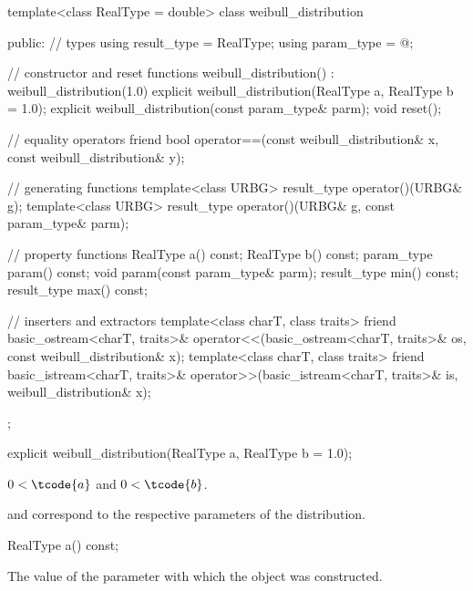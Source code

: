 %
%
\begin{codeblock}
template<class RealType = double>
  class weibull_distribution {
  public:
    // types
    using result_type = RealType;
    using param_type  = @\unspec@;

    // constructor and reset functions
    weibull_distribution() : weibull_distribution(1.0) {}
    explicit weibull_distribution(RealType a, RealType b = 1.0);
    explicit weibull_distribution(const param_type& parm);
    void reset();

    // equality operators
    friend bool operator==(const weibull_distribution& x, const weibull_distribution& y);

    // generating functions
    template<class URBG>
      result_type operator()(URBG& g);
    template<class URBG>
      result_type operator()(URBG& g, const param_type& parm);

    // property functions
    RealType a() const;
    RealType b() const;
    param_type param() const;
    void param(const param_type& parm);
    result_type min() const;
    result_type max() const;

    // inserters and extractors
    template<class charT, class traits>
      friend basic_ostream<charT, traits>&
        operator<<(basic_ostream<charT, traits>& os, const weibull_distribution& x);
    template<class charT, class traits>
      friend basic_istream<charT, traits>&
        operator>>(basic_istream<charT, traits>& is, weibull_distribution& x);
  };
\end{codeblock}

%
\begin{itemdecl}
explicit weibull_distribution(RealType a, RealType b = 1.0);
\end{itemdecl}

\begin{itemdescr}
\pnum
\expects
$0 < \tcode{a}$ and $0 < \tcode{b}$.

\pnum
\remarks
{} and 
correspond to the respective parameters of the distribution.
\end{itemdescr}

%
\begin{itemdecl}
RealType a() const;
\end{itemdecl}

\begin{itemdescr}
\pnum
\returns
The value of the  parameter
 with which the object was constructed.
\end{itemdescr}

